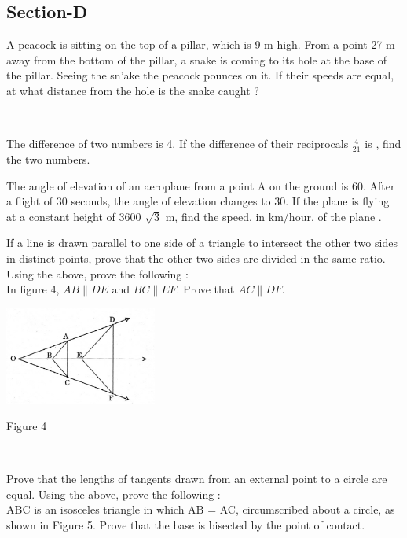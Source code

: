 \documentclass[journal,12pt,twocolumn]{IEEEtran}
\begin{document}
\begin{enumerate}
{\section{Section-D}

\item A peacock is sitting on the top of a pillar, which is 9 m high. From a point 27 m away from the bottom of the pillar, a snake is coming to its hole at the base of the pillar. Seeing the sn'ake the peacock pounces on it. If their speeds are equal, at what distance from the hole is the snake caught ?\\
{\centering

    \caption{\textbf{}\\ }
                        }
The difference of two numbers is 4. If the difference of their reciprocals $\frac{4}{21}$  is , find the two numbers. \\
\item The angle of elevation of an aeroplane from a point A on the ground is 60\textdegree. After a flight of 30 seconds, the angle of elevation changes to 30\textdegree. If the plane is flying at a constant
height of 3600 $\sqrt{3}$ m, find the speed, in km/hour, of the plane .\\
\item If a line is drawn parallel to one side of a triangle to intersect the other two sides in distinct points, prove that the other two sides are divided in the same ratio.\\
Using the above, prove the following :\\
In figure 4, $AB\parallel DE$ and $BC \parallel EF$. Prove that $AC \parallel DF$.

{\centering
    \includegraphics[width=5cm, center]{6.png}
    \caption{Figure 4 \\ }
    \label{Some label}}

{\centering

    \caption{\textbf{}\\ }
                        }

Prove that the lengths of tangents drawn from an external point to a circle are equal. Using the above, prove the following : \\
ABC is an isosceles triangle in which AB = AC, circumscribed about a circle, as shown in Figure 5. Prove that the base is bisected by the point of contact. \\

}
\end{enumerate}
\end{document}
